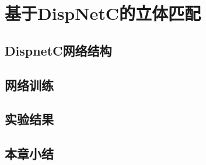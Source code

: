 
\chapter{基于DispNetC的立体匹配}

\section{DispnetC网络结构}

\section{网络训练}

\section{实验结果}

\section{本章小结}

